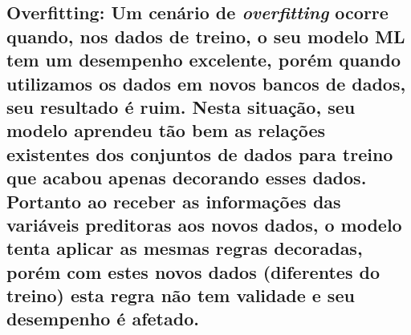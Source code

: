 \documentclass[
]{book}
\begin{document}
\hypertarget{overfitting-um-cenuxe1rio-de-overfitting-ocorre-quando-nos-dados-de-treino-o-seu-modelo-ml-tem-um-desempenho-excelente-poruxe9m-quando-utilizamos-os-dados-em-novos-bancos-de-dados-seu-resultado-uxe9-ruim.-nesta-situauxe7uxe3o-seu-modelo-aprendeu-tuxe3o-bem-as-relauxe7uxf5es-existentes-dos-conjuntos-de-dados-para-treino-que-acabou-apenas-decorando-esses-dados.-portanto-ao-receber-as-informauxe7uxf5es-das-variuxe1veis-preditoras-aos-novos-dados-o-modelo-tenta-aplicar-as-mesmas-regras-decoradas-poruxe9m-com-estes-novos-dados-diferentes-do-treino-esta-regra-nuxe3o-tem-validade-e-seu-desempenho-uxe9-afetado.}{%
\subsection{\texorpdfstring{\textbf{Overfitting}: Um cenário de \emph{overfitting} ocorre quando, nos dados de treino, o seu modelo ML tem um desempenho excelente, porém quando utilizamos os dados em novos bancos de dados, seu resultado é ruim. Nesta situação, seu modelo aprendeu tão bem as relações existentes dos conjuntos de dados para treino que acabou apenas decorando esses dados. Portanto ao receber as informações das variáveis preditoras aos novos dados, o modelo tenta aplicar as mesmas regras decoradas, porém com estes novos dados (diferentes do treino) esta regra não tem validade e seu desempenho é afetado.}{Overfitting: Um cenário de overfitting ocorre quando, nos dados de treino, o seu modelo ML tem um desempenho excelente, porém quando utilizamos os dados em novos bancos de dados, seu resultado é ruim. Nesta situação, seu modelo aprendeu tão bem as relações existentes dos conjuntos de dados para treino que acabou apenas decorando esses dados. Portanto ao receber as informações das variáveis preditoras aos novos dados, o modelo tenta aplicar as mesmas regras decoradas, porém com estes novos dados (diferentes do treino) esta regra não tem validade e seu desempenho é afetado.}}\label{overfitting-um-cenuxe1rio-de-overfitting-ocorre-quando-nos-dados-de-treino-o-seu-modelo-ml-tem-um-desempenho-excelente-poruxe9m-quando-utilizamos-os-dados-em-novos-bancos-de-dados-seu-resultado-uxe9-ruim.-nesta-situauxe7uxe3o-seu-modelo-aprendeu-tuxe3o-bem-as-relauxe7uxf5es-existentes-dos-conjuntos-de-dados-para-treino-que-acabou-apenas-decorando-esses-dados.-portanto-ao-receber-as-informauxe7uxf5es-das-variuxe1veis-preditoras-aos-novos-dados-o-modelo-tenta-aplicar-as-mesmas-regras-decoradas-poruxe9m-com-estes-novos-dados-diferentes-do-treino-esta-regra-nuxe3o-tem-validade-e-seu-desempenho-uxe9-afetado.}}
\end{document}

